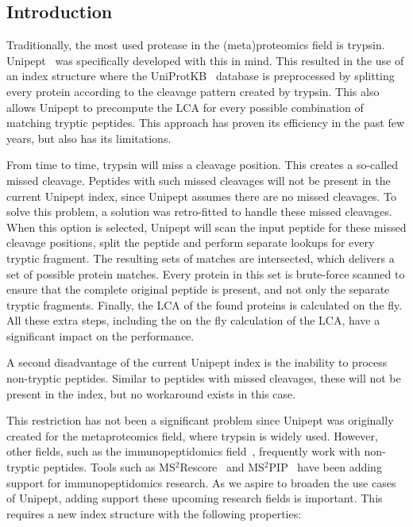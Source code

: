 \documentclass[11pt]{article}
\begin{document}
    \begin{multicols}{2}
        \section{Introduction}\label{sec:introduction}
        Traditionally, the most used protease in the (meta)proteomics field is trypsin.
        Unipept~\cite{unipept_desktop, unipept_api, unipept_4, unipept_orig, unipept_tutorial, unipept_web, unipept_cli, unipept_desktop_2} was specifically developed with this in mind.
        This resulted in the use of an index structure where the UniProtKB~\cite{UniprotKB} database is preprocessed by splitting every protein according to the cleavage pattern created by trypsin.
        This also allows Unipept to precompute the LCA for every possible combination of matching tryptic peptides.
        This approach has proven its efficiency in the past few years, but also has its limitations.

        From time to time, trypsin will miss a cleavage position.
        This creates a so-called missed cleavage.
        Peptides with such missed cleavages will not be present in the current Unipept index, since Unipept assumes there are no missed cleavages.
        To solve this problem, a solution was retro-fitted to handle these missed cleavages.
        When this option is selected, Unipept will scan the input peptide for these missed cleavage positions, split the peptide and perform separate lookups for every tryptic fragment.
        The resulting sets of matches are intersected, which delivers a set of possible protein matches.
        Every protein in this set is brute-force scanned to ensure that the complete original peptide is present, and not only the separate tryptic fragments.
        Finally, the LCA of the found proteins is calculated on the fly.
        All these extra steps, including the on the fly calculation of the LCA, have a significant impact on the performance.

        A second disadvantage of the current Unipept index is the inability to process non-tryptic peptides.
        Similar to peptides with missed cleavages, these will not be present in the index, but no workaround exists in this case.

        This restriction has not been a significant problem since Unipept was originally created for the metaproteomics field, where trypsin is widely used.
        However, other fields, such as the immunopeptidomics field~\cite{immunopeptidomics}, frequently work with non-tryptic peptides.
        Tools such as MS$^2$Rescore~\cite{ms2rescore} and MS$^2$PIP~\cite{ms2pip} have been adding support for immunopeptidomics research.
        As we aspire to broaden the use cases of Unipept, adding support these upcoming research fields is important.
        This requires a new index structure with the following properties:


\end{multicols}
\end{document}
